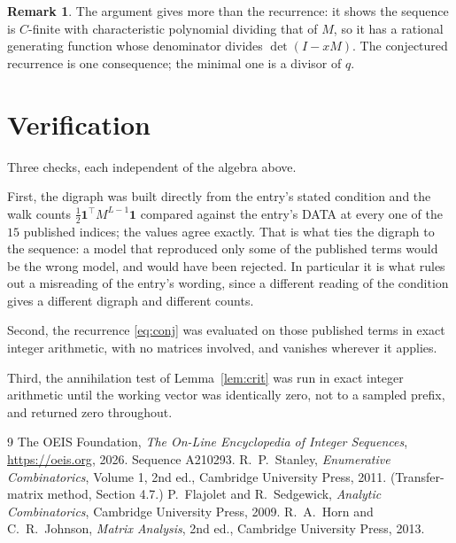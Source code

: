 \documentclass[11pt,a4paper]{article}
\theoremstyle{plain}
\theoremstyle{definition}
\newtheorem{remark}[theorem]{Remark}
\begin{document}
\begin{remark}
The argument gives more than the recurrence: it shows the sequence is $C$-finite with
characteristic polynomial dividing that of $M$, so it has a rational generating function
whose denominator divides $\det(I-xM)$. The conjectured recurrence is one consequence; the
minimal one is a divisor of $q$.
\end{remark}

\section{Verification}

Three checks, each independent of the algebra above.

First, the digraph was built directly from the entry's stated condition and the walk counts
$\tfrac1{2}\mathbf{1}^{\!\top}M^{L-1}\mathbf{1}$ compared against the entry's DATA at
every one of the $15$ published indices; the values agree exactly. That is what ties
the digraph to the sequence: a model that reproduced only some of the published terms would
be the wrong model, and would have been rejected. In particular it is what rules out a
misreading of the entry's wording, since a different reading of the condition gives a
different digraph and different counts.

Second, the recurrence \eqref{eq:conj} was evaluated on those published terms in exact
integer arithmetic, with no matrices involved, and vanishes wherever it applies.

Third, the annihilation test of Lemma~\ref{lem:crit} was run in exact integer arithmetic
until the working vector was identically zero, not to a sampled prefix, and returned zero
throughout.

\begin{thebibliography}{9}
 The OEIS Foundation, \emph{The On-Line Encyclopedia of Integer
Sequences}, \url{https://oeis.org}, 2026. Sequence A210293.
 R.~P.~Stanley, \emph{Enumerative Combinatorics}, Volume 1, 2nd ed.,
Cambridge University Press, 2011. (Transfer-matrix method, Section 4.7.)
 P.~Flajolet and R.~Sedgewick, \emph{Analytic Combinatorics}, Cambridge
University Press, 2009.
 R.~A.~Horn and C.~R.~Johnson, \emph{Matrix Analysis}, 2nd ed., Cambridge
University Press, 2013.
\end{thebibliography}
\end{document}

